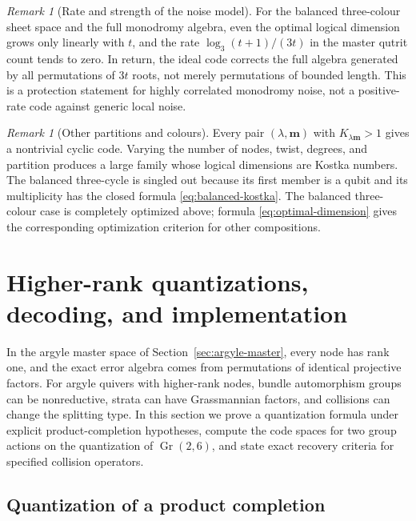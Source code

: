 \documentclass[11pt]{article}
\theoremstyle{definition}
\theoremstyle{remark}
\newtheorem{remark}[theorem]{Remark}
\newcommand{\Gr}{\operatorname{Gr}}
\begin{document}
\begin{remark}[Rate and strength of the noise model]\label{rem:balanced-rate}
For the balanced three-colour sheet space and the full monodromy algebra, even the optimal logical dimension grows only linearly with $t$, and the rate $\log_3(t+1)/(3t)$ in the master qutrit count tends to zero.  In return, the ideal code corrects the full algebra generated by all permutations of $3t$ roots, not merely permutations of bounded length.  This is a protection statement for highly correlated monodromy noise, not a positive-rate code against generic local noise.
\end{remark}

\begin{remark}[Other partitions and colours]\label{rem:other-kostka}
Every pair $(\lambda,\boldsymbol m)$ with $K_{\lambda\boldsymbol m}>1$ gives a nontrivial cyclic code.  Varying the number of nodes, twist, degrees, and partition produces a large family whose logical dimensions are Kostka numbers.  The balanced three-cycle is singled out because its first member is a qubit and its multiplicity has the closed formula \eqref{eq:balanced-kostka}.  The balanced three-colour case is completely optimized above; formula \eqref{eq:optimal-dimension} gives the corresponding optimization criterion for other compositions.
\end{remark}

\section{Higher-rank quantizations, decoding, and implementation}\label{sec:higher-argyle}

In the argyle master space of Section~\ref{sec:argyle-master}, every node has rank one, and the exact error algebra comes from permutations of identical projective factors.  For argyle quivers with higher-rank nodes, bundle automorphism groups can be nonreductive, strata can have Grassmannian factors, and collisions can change the splitting type.  In this section we prove a quantization formula under explicit product-completion hypotheses, compute the code spaces for two group actions on the quantization of $\Gr(2,6)$, and state exact recovery criteria for specified collision operators.

\subsection{Quantization of a product completion}
\end{document}
